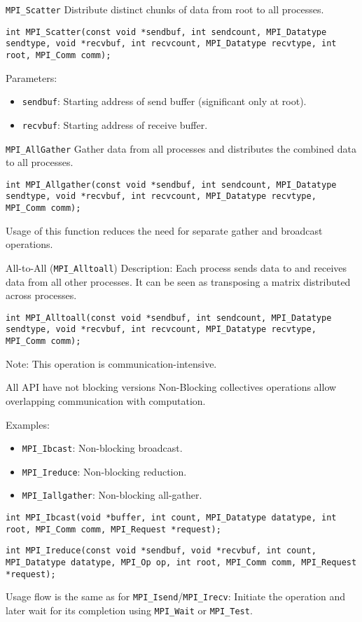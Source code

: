 \documentclass{beamer}
\begin{document}
\begin{frame}{\texttt{MPI\_Scatter}}
  Distribute distinct chunks of data from root to all processes.

  \texttt{int MPI\_Scatter(const void *sendbuf, int sendcount, MPI\_Datatype sendtype, void *recvbuf, int recvcount, MPI\_Datatype recvtype, int root, MPI\_Comm comm);}

  Parameters:
  \begin{itemize}
    \item \texttt{sendbuf}: Starting address of send buffer (significant only at root).
    \item \texttt{recvbuf}: Starting address of receive buffer.
  \end{itemize}
\end{frame}

\begin{frame}{\texttt{MPI\_AllGather}}
  Gather data from all processes and distributes the combined data to all processes.

  \texttt{int MPI\_Allgather(const void *sendbuf, int sendcount, MPI\_Datatype sendtype, void *recvbuf, int recvcount, MPI\_Datatype recvtype, MPI\_Comm comm);}

  Usage of this function reduces the need for separate gather and broadcast operations.
\end{frame}

\begin{frame}{All-to-All (\texttt{MPI\_Alltoall})}
  Description: Each process sends data to and receives data from all other processes. It can be seen as transposing a matrix distributed across processes.

  \texttt{int MPI\_Alltoall(const void *sendbuf, int sendcount, MPI\_Datatype sendtype, void *recvbuf, int recvcount, MPI\_Datatype recvtype, MPI\_Comm comm);}

  Note: This operation is communication-intensive.
\end{frame}

\begin{frame}{All API have not blocking versions}
  Non-Blocking collectives operations allow overlapping communication with computation.

  Examples:
  \begin{itemize}
    \item \texttt{MPI\_Ibcast}: Non-blocking broadcast.
    \item \texttt{MPI\_Ireduce}: Non-blocking reduction.
    \item \texttt{MPI\_Iallgather}: Non-blocking all-gather.
  \end{itemize}

  \texttt{int MPI\_Ibcast(void *buffer, int count, MPI\_Datatype datatype, int root, MPI\_Comm comm, MPI\_Request *request);}

  \texttt{int MPI\_Ireduce(const void *sendbuf, void *recvbuf, int count, MPI\_Datatype datatype, MPI\_Op op, int root, MPI\_Comm comm, MPI\_Request *request);}

  Usage flow is the same as for \texttt{MPI\_Isend}/\texttt{MPI\_Irecv}: Initiate the operation and later wait for its completion using \texttt{MPI\_Wait} or \texttt{MPI\_Test}.
\end{frame}
\end{document}
